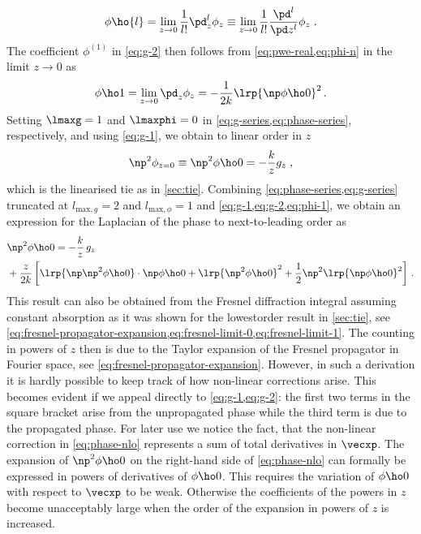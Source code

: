 \documentclass[
twoside,
openright,
titlepage,
numbers=noenddot,
headinclude,
fleqn,
a4paper,
footinclude=true,
cleardoublepage=empty,
abstractoff,
BCOR=5mm,
paper=a4,
fontsize=11pt,
british,ngerman,american,
]{scrreprt}
\begin{document}
\begin{equation}
  \label{eq:phi-n}
  \phi\ho{l} = \lim_{z\to 0}\frac{1}{l!}\pd_z^l\phi_z 
  \equiv \lim_{z\to 0}\frac{1}{l!}\frac{\pd^l}{\pd z^l}\phi_z \;.
\end{equation}
The coefficient $\phi^{(1)}$ in \cref{eq:g-2} then follows from
\cref{eq:pwe-real,eq:phi-n} in the limit $z\to 0$ as
\begin{equation}
  \label{eq:phi-1}
  \phi\ho1 = \lim_{z\to 0}\pd_z\phi_z = 
  -\frac{1}{2k}\lrp{\np\phi\ho0}^2 \,.
\end{equation}
Setting $\lmaxg=1$ and $\lmaxphi=0$ in
\cref{eq:g-series,eq:phase-series}, respectively, and using
\cref{eq:g-1}, we obtain to linear order in $z$
\begin{equation}
  \label{eq:phase-lo}
  \np^2\phi_{z=0} \equiv \np^2\phi\ho0 = -\frac{k}{z} g_z \;,
\end{equation}
which is the linearised \ac{tie} as in \cref{sec:tie}.  Combining
\cref{eq:phase-series,eq:g-series} truncated at $l_{\mathrm{max},g}=2$
and $l_{\mathrm{max},\phi}=1$ and \cref{eq:g-1,eq:g-2,eq:phi-1}, we
obtain an expression for the Laplacian of the phase to next-to-leading
order as
\begin{equation} 
  \label{eq:phase-nlo}
  \begin{split}
    & \np^2\phi\ho0 = -\frac{k}{z}\,g_z 
    \\ & +\frac{z}{2k}\left[
      \lrp{\np\np^2\phi\ho0}\cdot\np\phi\ho0
      +\lrp{\np^2\phi\ho0}^2 
      +\frac12\np^2\lrp{\np\phi\ho0}^2
    \right] \,. 
  \end{split}
\end{equation}
This result can also be obtained from the Fresnel diffraction integral
assuming constant absorption as it was shown for the lowest\hyph order
result in \cref{sec:tie}, see
\cref{eq:fresnel-propagator-expansion,eq:fresnel-limit-0,eq:fresnel-limit-1}.
The counting in powers of $z$ then is due to the Taylor expansion of
the Fresnel propagator in Fourier space, see
\cref{eq:fresnel-propagator-expansion}.  However, in such a derivation
it is hardly possible to keep track of how non-linear corrections
arise.  This becomes evident if we appeal directly to
\cref{eq:g-1,eq:g-2}: the first two terms in the square bracket arise
from the unpropagated phase while the third term is due to the
propagated phase.  For later use we notice the fact, that the
non-linear correction in \cref{eq:phase-nlo} represents a sum of total
derivatives in $\vecxp$.  The expansion of $\np^2\phi\ho0$ on the
right-hand side of \cref{eq:phase-nlo} can formally be expressed in
powers of derivatives of $\phi\ho0$.  This requires the variation of
$\phi\ho0$ with respect to $\vecxp$ to be weak.  Otherwise the
coefficients of the powers in $z$ become unacceptably large when the
order of the expansion in powers of $z$ is increased.
\end{document}
